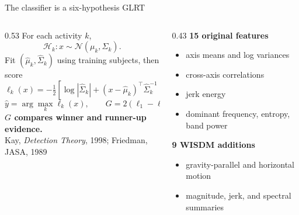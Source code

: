 \documentclass[aspectratio=169,11pt]{beamer}
\begin{document}
\begin{frame}{The classifier is a six-hypothesis GLRT}
  \small
  \setlength{\abovedisplayskip}{4pt}
  \setlength{\belowdisplayskip}{4pt}
  \begin{columns}[T,onlytextwidth]
    \begin{column}{0.53\textwidth}
      \vspace{0.08cm}
      For each activity $k$,
      \[
        \mathcal H_k:x\sim\mathcal N(\mu_k,\Sigma_k).
      \]
      Fit $(\widehat\mu_k,\widehat\Sigma_k)$ using training subjects, then score
      \[
        \ell_k(x)=-\tfrac12\!\left[
        \log|\widehat\Sigma_k|+(x-\widehat\mu_k)^\top
        \widehat\Sigma_k^{-1}(x-\widehat\mu_k)\right].
      \]
      \[
        \widehat y=\arg\max_k\ell_k(x),\qquad
        G=2(\ell_{1}-\ell_{2}).
      \]
      \vspace{0.10cm}
      {\color{SignatureBlue}\textbf{$G$ compares winner and runner-up evidence.}}\\[0.10cm]
      {\color{SignatureDark}\tiny Kay, \emph{Detection Theory}, 1998; Friedman, JASA, 1989}
    \end{column}
    \begin{column}{0.43\textwidth}
      \textbf{15 original features}
      \begin{itemize}
        \item axis means and log variances
        \item cross-axis correlations
        \item jerk energy
        \item dominant frequency, entropy, band power
      \end{itemize}
      \vspace{0.14cm}
      \textbf{9 WISDM additions}
      \begin{itemize}
        \item gravity-parallel and horizontal motion
        \item magnitude, jerk, and spectral summaries
      \end{itemize}
    \end{column}
  \end{columns}
\end{frame}
\end{document}
